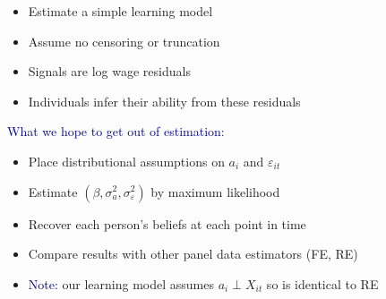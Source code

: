 \documentclass[aspectratio=169]{beamer}
\begin{document}
\begin{frame}

\begin{itemize}
\itemsep1.5em
\item<1-> Estimate a simple learning model
\item<2-> Assume no censoring or truncation
\item<3-> Signals are log wage residuals
\item<4-> Individuals infer their ability from these residuals
\end{itemize}

\end{frame}

\begin{frame}

\textcolor{navy}{What we hope to get out of estimation}:
\bigskip

\begin{itemize}
\itemsep1.5em
\item<2-> Place distributional assumptions on $a_i$ and $\varepsilon_{it}$
\item<3-> Estimate $(\beta,\sigma^2_a,\sigma^2_\varepsilon)$ by maximum likelihood
\item<4-> Recover each person's beliefs at each point in time
\item<5-> Compare results with other panel data estimators (FE, RE)
\item<6-> \textcolor{navy}{Note:} our learning model assumes $a_i \perp X_{it}$ so is identical to RE
\end{itemize}

\end{frame}
\end{document}
